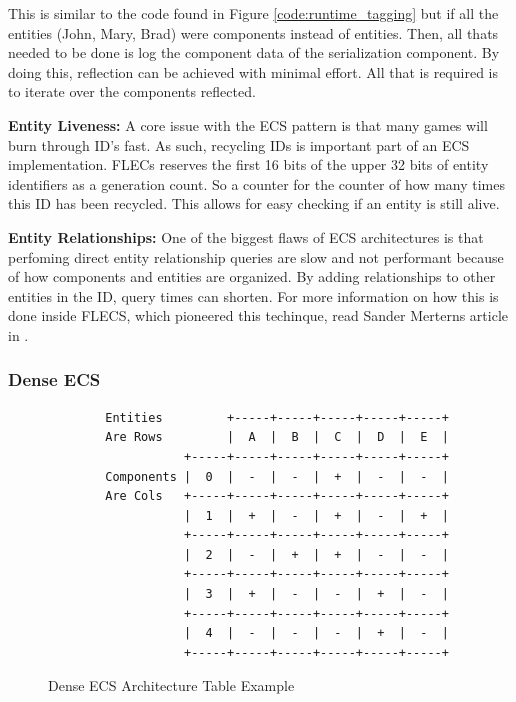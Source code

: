 This is similar to the code found in Figure \ref{code:runtime_tagging} but if all the entities (John, Mary, Brad) were components instead of entities. Then, all thats needed to be done is log the component data of the serialization component. By doing this, reflection can be achieved with minimal effort. All that is required is to iterate over the components reflected.

\textbf{Entity Liveness:}
A core issue with the ECS pattern is that many games will burn through ID's fast. As such, recycling IDs is important part of an ECS implementation. FLECs reserves the first 16 bits of the upper 32 bits of entity identifiers as a generation count. So a counter for the counter of how many times this ID has been recycled. This allows for easy checking if an entity is still alive.  

\textbf{Entity Relationships:}
One of the biggest flaws of ECS architectures is that perfoming direct entity relationship queries are slow and not performant because of how components and entities are organized. By adding relationships to other entities in the ID, query times can shorten. For more information on how this is done inside FLECS, which pioneered this techinque, read Sander Merterns article in \cite{SanderMertensEntityIDs}.

\subsubsection{Dense ECS}
\begin{figure}[htbp]
    \centering
    \begin{verbatim}
        Entities         +-----+-----+-----+-----+-----+  
        Are Rows         |  A  |  B  |  C  |  D  |  E  |  
                   +-----+-----+-----+-----+-----+-----+  
        Components |  0  |  -  |  -  |  +  |  -  |  -  |  
        Are Cols   +-----+-----+-----+-----+-----+-----+  
                   |  1  |  +  |  -  |  +  |  -  |  +  |  
                   +-----+-----+-----+-----+-----+-----+  
                   |  2  |  -  |  +  |  +  |  -  |  -  |  
                   +-----+-----+-----+-----+-----+-----+  
                   |  3  |  +  |  -  |  -  |  +  |  -  |  
                   +-----+-----+-----+-----+-----+-----+  
                   |  4  |  -  |  -  |  -  |  +  |  -  |  
                   +-----+-----+-----+-----+-----+-----+                                 
    \end{verbatim}
    \caption{Dense ECS Architecture Table Example}
\end{figure}

